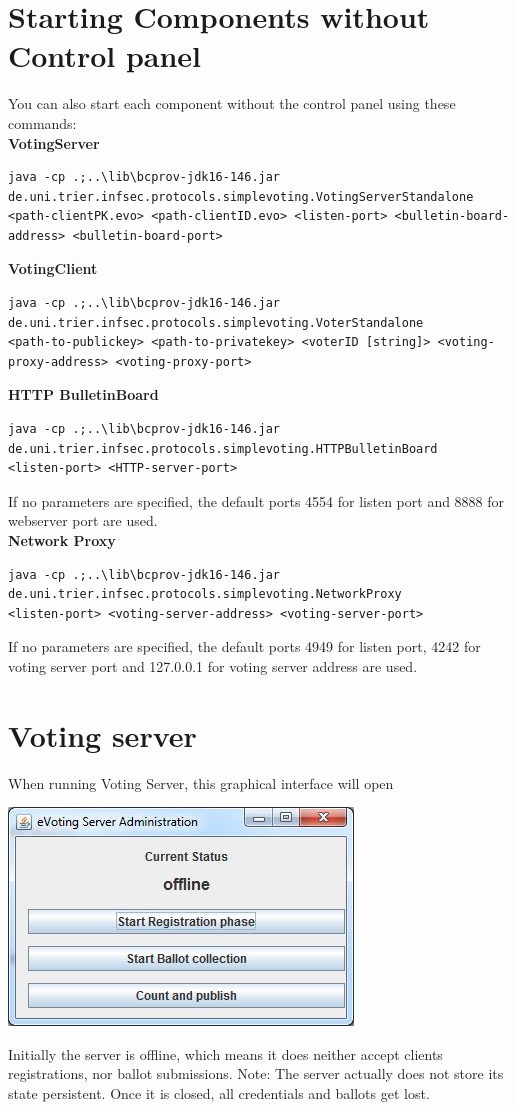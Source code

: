 \documentclass{article}
\begin{document}
\section{Starting Components without Control panel}
You can also start each component without the control panel using these commands:\\
\textbf{VotingServer}
\begin{lstlisting}
java -cp .;..\lib\bcprov-jdk16-146.jar 
de.uni.trier.infsec.protocols.simplevoting.VotingServerStandalone 
<path-clientPK.evo> <path-clientID.evo> <listen-port> <bulletin-board-address> <bulletin-board-port>
\end{lstlisting}
\textbf{VotingClient}
\begin{lstlisting}
java -cp .;..\lib\bcprov-jdk16-146.jar 
de.uni.trier.infsec.protocols.simplevoting.VoterStandalone
<path-to-publickey> <path-to-privatekey> <voterID [string]> <voting-proxy-address> <voting-proxy-port>
\end{lstlisting}
\textbf{HTTP BulletinBoard}
\begin{lstlisting}
java -cp .;..\lib\bcprov-jdk16-146.jar 
de.uni.trier.infsec.protocols.simplevoting.HTTPBulletinBoard 
<listen-port> <HTTP-server-port>
\end{lstlisting}
If no parameters are specified, the default ports 4554 for listen port and 8888 for webserver port are used.\\
\textbf{Network Proxy}
\begin{lstlisting}
java -cp .;..\lib\bcprov-jdk16-146.jar 
de.uni.trier.infsec.protocols.simplevoting.NetworkProxy
<listen-port> <voting-server-address> <voting-server-port>
\end{lstlisting}
If no parameters are specified, the default ports 4949 for listen port, 4242 for voting server port and 127.0.0.1 for voting server address are used.

\section{Voting server}
When running Voting Server, this graphical interface will open\\
\begin{center}\includegraphics{./server.jpg}\end{center}
Initially the server is offline, which means it does neither accept clients registrations, nor ballot submissions. Note: The server actually does not store its state persistent. Once it is closed, all credentials and ballots get lost.
\end{document}
